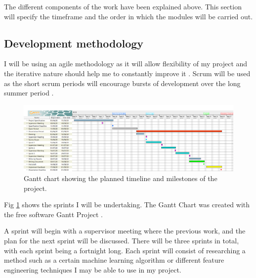 \documentclass{article}
\begin{document}
The different components of the work have been explained above.
This section will specify the timeframe and the order in which the modules will be carried out.

\subsection{Development methodology}



I will be using an agile methodology as it will allow flexibility of my project and the iterative nature should help me to constantly improve it \cite{beck2001manifesto}. 
Scrum will be used as the short scrum periods will encourage bursts of development over the long summer period \cite{schwaber1997scrum}.

\begin{figure}[ht]
    \centering
    \centerline{
        \includegraphics[scale=0.32]{GanttChart.PNG}
    }
    \caption{Gantt chart showing the planned timeline and milestones of the project.}
    \label{fig:Gantt}
\end{figure}

Fig \ref{fig:Gantt} shows the sprints I will be undertaking.
The Gantt Chart was created with the free software Gantt Project \cite{GanttProject}.

A sprint will begin with a supervisor meeting where the previous work, and the plan for the next sprint will be discussed.
There will be three sprints in total, with each sprint being a fortnight long.
Each sprint will consist of researching a method such as a certain machine learning algorithm or different feature engineering techniques I may be able to use in my project.
\end{document}
